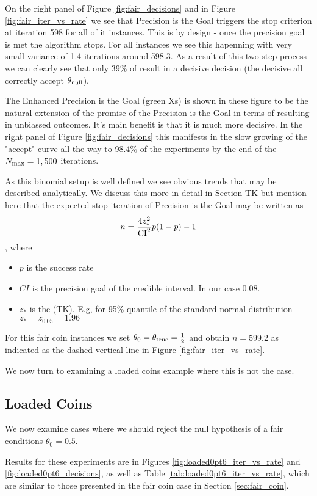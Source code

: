 On the right panel of Figure \ref{fig:fair_decisions} and in Figure \ref{fig:fair_iter_vs_rate}
we see that Precision is the Goal triggers the stop criterion at iteration 598 for all of
it instances. This is by design - once the precision goal is met the algorithm stops.
For all instances we see this hapenning with very small variance of 1.4 iterations around 598.3.
As a result of this two step process we can clearly see that only 39\% of result in a decisive decision
(the decisive all correctly accept $\theta_{\rm null}$). 

The Enhanced Precision is the Goal (green Xs) is shown in these figure to be the natural extension
of the promise of the Precision is the Goal in terms of resulting in unbiassed outcomes. It's main 
benefit is that it is much more decisive. In the right panel of Figure \ref{fig:fair_decisions}
this manifests in the slow growing of the "accept" curve all the way to 98.4\% of the experiments
by the end of the $N_{\rm max}=1,500$ iterations.

As this binomial setup is well defined we see obvious trends
that may be described analytically. We discuss this more in detail
in Section TK but mention here that the expected stop iteration of Precision is the Goal
may be written as $$n = \frac{4 z_{*}^2}{\rm{CI}^2}p(1-p) - 1$$,
where 

\begin{itemize}
  \item $p$ is the success rate
  \item $CI$ is the precision goal of the credible interval. In our case 0.08.
  \item $z_{*}$ is the (TK). E.g, for 95\% quantile of the standard normal
  distribution $z_{*}=z_{0.05}=1.96$
\end{itemize}

For this fair coin instances we set $\theta_0=\theta_{\rm true}=\frac{1}{2}$ and obtain
$n=599.2$ as indicated as the dashed vertical line in Figure \ref{fig:fair_iter_vs_rate}.

We now turn to examining a loaded coins example where this is not the case.

\subsection{Loaded Coins}
We now examine cases where we should reject the null hypothesis of a fair conditions
$\theta_{0}=0.5$.

Results for these experiments are in Figures \ref{fig:loaded0pt6_iter_vs_rate} and
\ref{fig:loaded0pt6_decisions}, as well as Table \ref{tab:loaded0pt6_iter_vs_rate},
which are similar to those presented in the fair coin case in
Section \ref{sec:fair_coin}.

